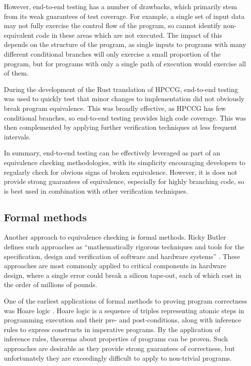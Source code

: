 However, end-to-end testing has a number of drawbacks, which primarily stem from its weak guarantees of test coverage. For example, a single set of input data may not fully exercise the control flow of the program, so cannot identify non-equivalent code in these areas which are not executed. The impact of this depends on the structure of the program, as single inputs to programs with many different conditional branches will only exercise a small proportion of the program, but for programs with only a single path of execution would exercise all of them.

During the development of the Rust translation of \acrshort{HPCCG}, end-to-end testing was used to quickly test that minor changes to implementation did not obviously break program equivalence. This was broadly effective, as \acrshort{HPCCG} has few conditional branches, so end-to-end testing provides high code coverage. This was then complemented by applying further verification techniques at less frequent intervals.

In summary, end-to-end testing can be effectively leveraged as part of an equivalence checking methodologies, with its simplicity encouraging developers to regularly check for obvious signs of broken equivalence. However, it is does not provide strong guarantees of equivalence, especially for highly branching code, so is best used in combination with other verification techniques.

\subsection{Formal methods}
\label{ssec:equivalence-formal-methods}

Another approach to equivalence checking is formal methods. Ricky Butler defines such approaches as ``mathematically rigorous techniques and tools for the specification, design and verification of software and hardware systems'' \cite{LangleyFormalMethods}. These approaches are most commonly applied to critical components in hardware design, where a single error could break a silicon tape-out, each of which cost in the order of millions of pounds.

One of the earliest applications of formal methods to proving program correctness was Hoare logic \cite{hoareAxiomaticBasisComputer1969}. Hoare logic is a sequence of triples representing atomic steps in programming execution and their pre- and post-conditions, along with inference rules to express constructs in imperative programs. By the application of inference rules, theorems about properties of programs can be proven. Such approaches are desirable as they provide strong guarantees of correctness, but unfortunately they are exceedingly difficult to apply to non-trivial programs.


